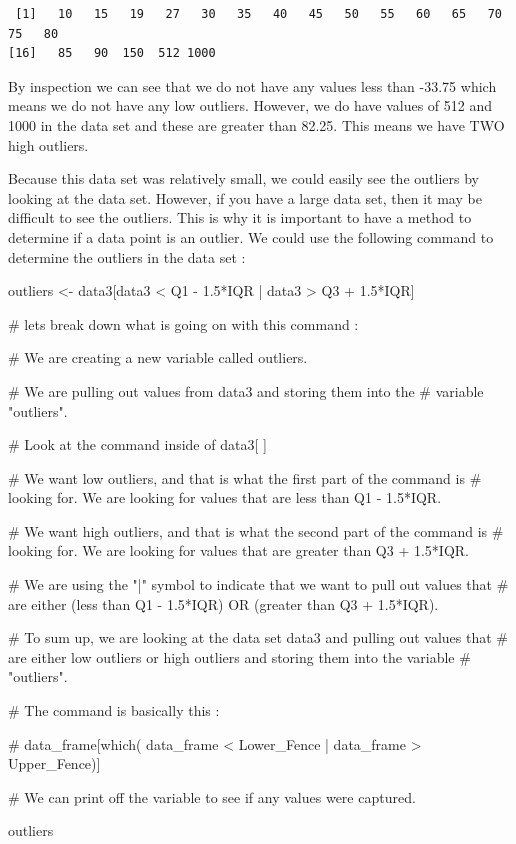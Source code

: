 \documentclass[
  letterpaper,
  DIV=11,
  numbers=noendperiod]{scrreprt}
\newenvironment{Shaded}{\begin{snugshade}}{\end{snugshade}}
\newcommand{\CommentTok}[1]{\textcolor[rgb]{0.37,0.37,0.37}{#1}}
\newcommand{\FloatTok}[1]{\textcolor[rgb]{0.68,0.00,0.00}{#1}}
\newcommand{\NormalTok}[1]{\textcolor[rgb]{0.00,0.23,0.31}{#1}}
\newcommand{\OtherTok}[1]{\textcolor[rgb]{0.00,0.23,0.31}{#1}}
\newcommand{\SpecialCharTok}[1]{\textcolor[rgb]{0.37,0.37,0.37}{#1}}
\begin{document}
\begin{verbatim}
 [1]   10   15   19   27   30   35   40   45   50   55   60   65   70   75   80
[16]   85   90  150  512 1000
\end{verbatim}

By inspection we can see that we do not have any values less than -33.75
which means we do not have any low outliers. However, we do have values
of 512 and 1000 in the data set and these are greater than 82.25. This
means we have TWO high outliers.

Because this data set was relatively small, we could easily see the
outliers by looking at the data set. However, if you have a large data
set, then it may be difficult to see the outliers. This is why it is
important to have a method to determine if a data point is an outlier.
We could use the following command to determine the outliers in the data
set :

\begin{Shaded}
\begin{Highlighting}[]
\NormalTok{outliers }\OtherTok{\textless{}{-}}\NormalTok{ data3[data3 }\SpecialCharTok{\textless{}}\NormalTok{ Q1 }\SpecialCharTok{{-}} \FloatTok{1.5}\SpecialCharTok{*}\NormalTok{IQR }\SpecialCharTok{|}\NormalTok{ data3 }\SpecialCharTok{\textgreater{}}\NormalTok{ Q3 }\SpecialCharTok{+} \FloatTok{1.5}\SpecialCharTok{*}\NormalTok{IQR]}

\CommentTok{\# let\textquotesingle{}s break down what is going on with this command :}

\CommentTok{\# We are creating a new variable called outliers.}

\CommentTok{\# We are pulling out values from data3 and storing them into the }
\CommentTok{\# variable "outliers".}

\CommentTok{\# Look at the command inside of data3[ ]}

\CommentTok{\# We want low outliers, and that is what the first part of the command is}
\CommentTok{\# looking for. We are looking for values that are less than Q1 {-} 1.5*IQR.}

\CommentTok{\# We want high outliers, and that is what the second part of the command is}
\CommentTok{\# looking for. We are looking for values that are greater than Q3 + 1.5*IQR.}

\CommentTok{\# We are using the "|" symbol to indicate that we want to pull out values that}
\CommentTok{\# are either (less than Q1 {-} 1.5*IQR) OR (greater than Q3 + 1.5*IQR).}

\CommentTok{\# To sum up, we are looking at the data set data3 and pulling out values that}
\CommentTok{\# are either low outliers or high outliers and storing them into the variable}
\CommentTok{\# "outliers".}

\CommentTok{\# The command is basically this : }

\CommentTok{\# data\_frame[which( data\_frame \textless{} Lower\_Fence | data\_frame \textgreater{} Upper\_Fence)]}

\CommentTok{\# We can print off the variable to see if any values were captured.}

\NormalTok{outliers}
\end{Highlighting}
\end{Shaded}
\end{document}
